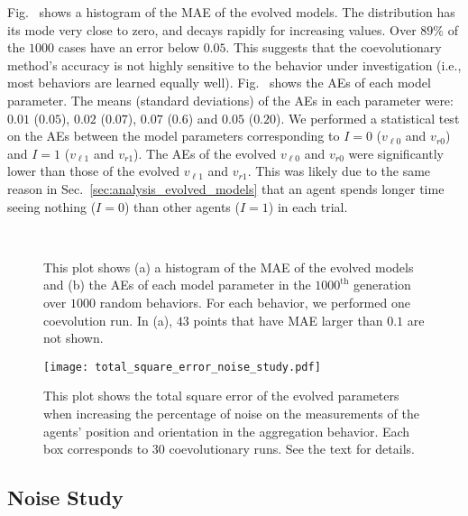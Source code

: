 Fig.~ shows a histogram of the MAE of the evolved models. The distribution has its mode very close to zero, and decays rapidly for increasing values. Over $89\%$ of the $1000$ cases have an error below $0.05$. This suggests that the coevolutionary method's accuracy is not highly sensitive to the behavior under investigation (i.e., most behaviors are learned equally well). Fig.~ shows the AEs of each model parameter. The means (standard deviations) of the AEs in each parameter were: $0.01$ ($0.05$), $0.02$ ($0.07$), $0.07$ ($0.6$) and $0.05$ ($0.20$). We performed a statistical test on the AEs between the model parameters corresponding to $I=0$ ($v_{\ell0}$ and $v_{r0}$) and $I=1$ ($v_{\ell1}$ and $v_{r1}$). The AEs of the evolved $v_{\ell0}$ and  $v_{r0}$ were significantly lower than those of the evolved $v_{\ell1}$ and  $v_{r1}$. This was likely due to the same reason in Sec.~\ref{sec:analysis_evolved_models} that an agent spends longer time seeing nothing ($I=0$) than other agents ($I=1$) in each trial.
\begin{figure}[!h]%
	\centering
		\\
		\caption{This plot shows (a) a histogram of the MAE of the evolved models and (b) the AEs of each model parameter in the $1000^\textrm{th}$ generation over $1000$ random behaviors. For each behavior, we performed one coevolution run. In (a), $43$ points that have MAE larger than $0.1$ are not shown.}
		\label{fig:model_parameters_random_controllers}
\end{figure}

\begin{figure}[!h]%
	\centering
	\texttt{[image: total\_square\_error\_noise\_study.pdf]}
	\caption{This plot shows the total square error of the evolved parameters when increasing the percentage of noise on the measurements of the agents' position and orientation in the aggregation behavior. Each box corresponds to 30 coevolutionary runs. See the text for details.
\label{fig:total_square_error_noise_study}}
\end{figure}

\subsection{Noise Study}\label{sec:noise_study_swarm}


